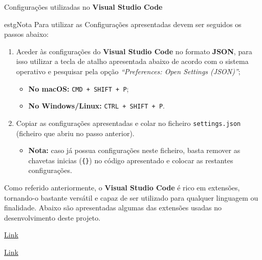 \label{vscodeAttachments}


\begin{longlisting}
	\inputminted{json}{code/vscode-settings.json}
	\caption{Configurações utilizadas no \textbf{Visual Studio Code}}
\end{longlisting}

\begin{mybox}{estg}{Nota}
	Para utilizar as Configurações apresentadas devem ser seguidos os passos abaixo:

	\begin{enumerate}
		\item Aceder às configurações do \textbf{Visual Studio Code} no formato \textbf{JSON}, para isso utilizar a tecla de atalho apresentada abaixo de acordo com o sistema operativo e pesquisar pela opção \textit{``Preferences: Open Settings (JSON)''};
		\begin{itemize}
			\item \textbf{No macOS:} \texttt{CMD + SHIFT + P};
			\item \textbf{No Windows/Linux:} \texttt{CTRL + SHIFT + P}.
		\end{itemize}
		\item Copiar as configurações apresentadas e colar no ficheiro \texttt{settings.json} (ficheiro que abriu no passo anterior).
		\begin{itemize}
			\item \textbf{Nota:} caso já possua configurações neste ficheiro, basta remover as chavetas inicias (\verb|{}|) no código apresentado e colocar as restantes configurações.
		\end{itemize}
	\end{enumerate}
\end{mybox}


Como referido anteriormente, o \textbf{Visual Studio Code} é rico em extensões, tornando-o bastante versátil e capaz de ser utilizado para qualquer linguagem ou finalidade. Abaixo são apresentadas algumas das extensões usadas no desenvolvimento deste projeto.

\begin{minipage}[t]{0.5\textwidth}
	\centering

	\href{https://marketplace.visualstudio.com/items?itemName=dsznajder.es7-react-js-snippets}{Link}
\end{minipage}
\begin{minipage}[t]{0.5\textwidth}
	\centering

	\href{https://marketplace.visualstudio.com/items?itemName=steoates.autoimport}{Link}
\end{minipage}

